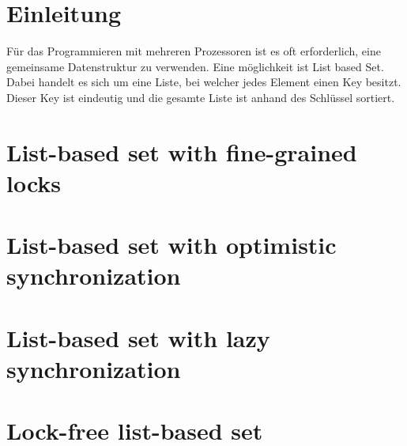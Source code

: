 \documentclass[10pt,a4paper,titlepage,oneside]{article}
\begin{document}
 

\maketitle  

\tableofcontents
\newpage  
\section{Einleitung}
Für das Programmieren mit mehreren Prozessoren ist es oft erforderlich, eine gemeinsame Datenstruktur zu verwenden. 
Eine möglichkeit ist List based Set. Dabei handelt es sich um eine Liste, bei welcher jedes Element einen Key besitzt.
Dieser Key ist eindeutig und die gesamte Liste ist anhand des Schlüssel sortiert. 
\section{List-based set with fine-grained locks}
\section{List-based set with optimistic synchronization}
\section{List-based set with lazy synchronization}
\section{Lock-free list-based set}

 

	


		
\end{document}
